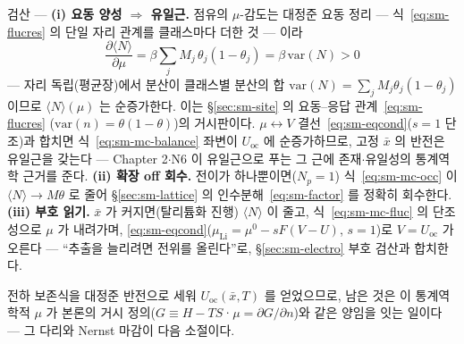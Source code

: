 \begin{verifybox}
검산 --- \textbf{(i) 요동 양성 $\Rightarrow$ 유일근.} 점유의 $\mu$-감도는 대정준 요동 정리
\cite{mcquarrie1976} --- 식~\eqref{eq:sm-flucres} 의 단일 자리 관계를 클래스마다 더한 것 --- 이라
\begin{equation}
\frac{\partial\langle N\rangle}{\partial\mu}
=\beta\sum_j M_j\,\theta_j(1-\theta_j)=\beta\,\mathrm{var}(N)>0
\label{eq:sm-mc-fluc}
\end{equation}
--- 자리 독립(평균장)에서 분산이 클래스별 분산의 합 $\mathrm{var}(N)=\sum_j M_j\theta_j(1-\theta_j)$ 이므로
$\langle N\rangle(\mu)$ 는 순증가한다. 이는 \S\ref{sec:sm-site} 의 요동--응답 관계~\eqref{eq:sm-flucres}
($\mathrm{var}(n)=\theta(1-\theta)$)의 거시판이다. $\mu\leftrightarrow V$ 결선~\eqref{eq:sm-eqcond}($s{=}1$
단조)과 합치면 식~\eqref{eq:sm-mc-balance} 좌변이 $U_\mathrm{oc}$ 에 순증가하므로, 고정 $\bar x$ 의 반전은
유일근을 갖는다 --- Chapter 2$\cdot$N6 이 유일근으로 푸는 그 근에 존재$\cdot$유일성의 통계역학 근거를 준다.
\textbf{(ii) 확장 off 회수.} 전이가 하나뿐이면($N_p{=}1$) 식~\eqref{eq:sm-mc-occ} 이
$\langle N\rangle\to M\theta$ 로 줄어 \S\ref{sec:sm-lattice} 의 인수분해~\eqref{eq:sm-factor} 를 정확히 회수한다.
\textbf{(iii) 부호 읽기.} $\bar x$ 가 커지면(탈리튬화 진행) $\langle N\rangle$ 이 줄고, 식~\eqref{eq:sm-mc-fluc}
의 단조성으로 $\mu$ 가 내려가며, \eqref{eq:sm-eqcond}($\mu_\mathrm{Li}=\mu^0-sF(V-U)$, $s{=}1$)로 $V=U_\mathrm{oc}$
가 오른다 --- ``추출을 늘리려면 전위를 올린다''로, \S\ref{sec:sm-electro} 부호 검산과 합치한다.
\end{verifybox}

전하 보존식을 대정준 반전으로 세워 $U_\mathrm{oc}(\bar x,T)$ 를 얻었으므로, 남은 것은 이 통계역학적 $\mu$ 가
본론의 거시 정의($G\equiv H-TS$·$\mu=\partial G/\partial n$)와 같은 양임을 잇는 일이다 --- 그 다리와 Nernst
마감이 다음 소절이다.

